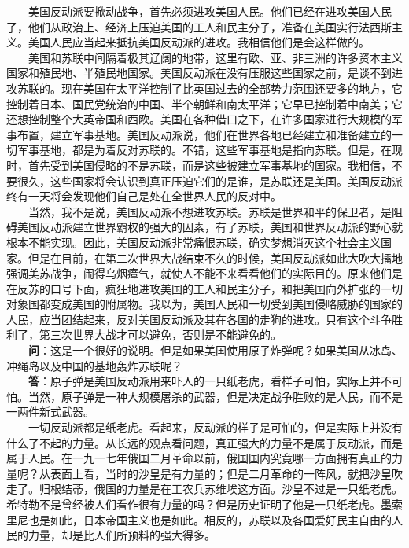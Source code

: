 \documentclass[cn,11pt,chinese]{elegantbook}
\begin{document}
　　美国反动派要掀动战争，首先必须进攻美国人民。他们已经在进攻美国人民了，他们从政治上、经济上压迫美国的工人和民主分子，准备在美国实行法西斯主义。美国人民应当起来抵抗美国反动派的进攻。我相信他们是会这样做的。\\
　　美国和苏联中间隔着极其辽阔的地带，这里有欧、亚、非三洲的许多资本主义国家和殖民地、半殖民地国家。美国反动派在没有压服这些国家之前，是谈不到进攻苏联的。现在美国在太平洋控制了比英国过去的全部势力范围还要多的地方，它控制着日本、国民党统治的中国、半个朝鲜和南太平洋；它早已控制着中南美；它还想控制整个大英帝国和西欧。美国在各种借口之下，在许多国家进行大规模的军事布置，建立军事基地。美国反动派说，他们在世界各地已经建立和准备建立的一切军事基地，都是为着反对苏联的。不错，这些军事基地是指向苏联。但是，在现时，首先受到美国侵略的不是苏联，而是这些被建立军事基地的国家。我相信，不要很久，这些国家将会认识到真正压迫它们的是谁，是苏联还是美国。美国反动派终有一天将会发现他们自己是处在全世界人民的反对中。\\
　　当然，我不是说，美国反动派不想进攻苏联。苏联是世界和平的保卫者，是阻碍美国反动派建立世界霸权的强大的因素，有了苏联，美国和世界反动派的野心就根本不能实现。因此，美国反动派非常痛恨苏联，确实梦想消灭这个社会主义国家。但是在目前，在第二次世界大战结束不久的时候，美国反动派如此大吹大擂地强调美苏战争，闹得乌烟瘴气，就使人不能不来看看他们的实际目的。原来他们是在反苏的口号下面，疯狂地进攻美国的工人和民主分子，和把美国向外扩张的一切对象国都变成美国的附属物。我以为，美国人民和一切受到美国侵略威胁的国家的人民，应当团结起来，反对美国反动派及其在各国的走狗的进攻。只有这个斗争胜利了，第三次世界大战才可以避免，否则是不能避免的。\\
　　\textbf{问}：这是一个很好的说明。但是如果美国使用原子炸弹呢？如果美国从冰岛、冲绳岛以及中国的基地轰炸苏联呢？\\
　　\textbf{答}：原子弹是美国反动派用来吓人的一只纸老虎，看样子可怕，实际上并不可怕。当然，原子弹是一种大规模屠杀的武器，但是决定战争胜败的是人民，而不是一两件新式武器。\\
　　一切反动派都是纸老虎。看起来，反动派的样子是可怕的，但是实际上并没有什么了不起的力量。从长远的观点看问题，真正强大的力量不是属于反动派，而是属于人民。在一九一七年俄国二月革命以前，俄国国内究竟哪一方面拥有真正的力量呢？从表面上看，当时的沙皇是有力量的；但是二月革命的一阵风，就把沙皇吹走了。归根结蒂，俄国的力量是在工农兵苏维埃这方面。沙皇不过是一只纸老虎。希特勒不是曾经被人们看作很有力量的吗？但是历史证明了他是一只纸老虎。墨索里尼也是如此，日本帝国主义也是如此。相反的，苏联以及各国爱好民主自由的人民的力量，却是比人们所预料的强大得多。\\
\end{document}
